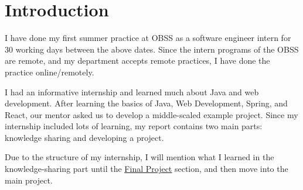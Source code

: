 \section{Introduction}
\label{introduction}

I have done my first summer practice at OBSS as a software engineer intern for 30 working days between the above dates. Since the intern programs of the OBSS are remote, and my department accepts remote practices, I have done the practice online/remotely.

I had an informative internship and learned much about Java and web development. After learning the basics of Java, Web Development, Spring, and React, our mentor asked us to develop a middle-scaled example project. Since my internship included lots of learning, my report contains two main parts: knowledge sharing and developing a project.

Due to the structure of my internship, I will mention what I learned in the knowledge-sharing part until the \hyperref[final-project]{\underline{Final Project}} section, and then move into the main project.
